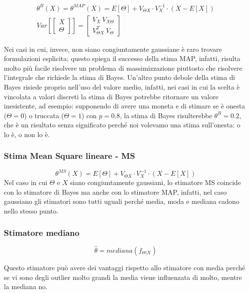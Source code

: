   \begin{gather*}
    \theta^B(X)=\theta^{MAP}(X)=E[\Theta]+V_{\Theta X} \cdot V_X^{-1} \cdot (X-E[X])\\
    Var \left[\begin{bmatrix} X \\ \Theta \end{bmatrix} \right]=\begin{bmatrix} V_X \ V_{X\Theta} \\ V_{\Theta X}^T \ V_\Theta \end{bmatrix}
  \end{gather*}
  
Nei casi in cui, invece, non siano congiuntamente gaussiane è raro trovare formulazioni esplicita; questo spiega il successo della stima MAP, infatti, risulta molto più facile risolvere un problema di massimizzazione piuttosto che risolvere l'integrale che richiede la stima di Bayes. Un'altro punto debole della stima di Bayes risiede proprio nell'uso del valore medio, infatti, nei casi in cui la scelta è vincolata a valori discreti la stima di Bayes potrebbe ritornare un valore inesistente, ad esempio: supponendo di avere una moneta e di stimare se è onesta ($\Theta=0$) o truccata ($\Theta=1$) con $p=0.8$, la stima di Bayes risulterebbe $\theta^B=0.2$, che è un risultato senza significato perché noi volevamo una stima sull'onesta: o lo è, o non lo è.
\subsubsection{Stima Mean Square lineare - MS} %
  \[ \theta^{MS}(X)=E[\Theta]+V_{\Theta X} \cdot V_X^{-1} \cdot (X- E[X]) \]
Nel caso in cui $\Theta$ e $X$ siano congiuntamente gaussiani, lo stimatore MS coincide con lo stimatore di Bayes ma anche con lo stimatore MAP, infatti, nel caso gaussiano gli stimatori sono tutti uguali perché media, moda e mediana cadono nello stesso punto.
\subsubsection{Stimatore mediano} %

  \[ \hat{\theta}=mediana(f_{\Theta|X}) \]
  
Questo stimatore può avere dei vantaggi rispetto allo stimatore con media perché se vi sono degli outlier molto grandi la media viene influenzata di molto, mentre la mediana no.

